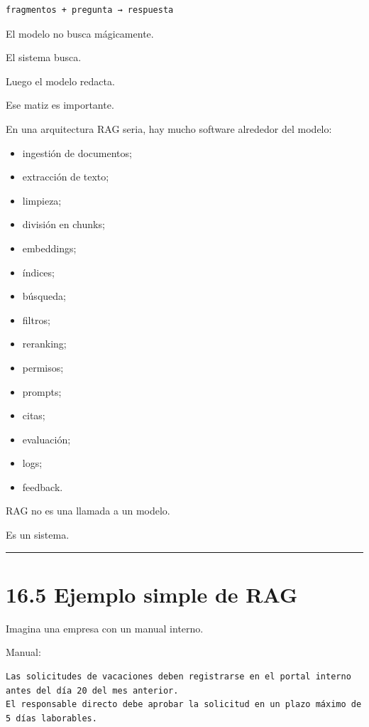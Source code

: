 \begin{lstlisting}
fragmentos + pregunta → respuesta
\end{lstlisting}

El modelo no busca mágicamente.

El sistema busca.

Luego el modelo redacta.

Ese matiz es importante.

En una arquitectura RAG seria, hay mucho software alrededor del modelo:

\begin{itemize}
\tightlist
\item
  ingestión de documentos;
\item
  extracción de texto;
\item
  limpieza;
\item
  división en chunks;
\item
  embeddings;
\item
  índices;
\item
  búsqueda;
\item
  filtros;
\item
  reranking;
\item
  permisos;
\item
  prompts;
\item
  citas;
\item
  evaluación;
\item
  logs;
\item
  feedback.
\end{itemize}

RAG no es una llamada a un modelo.

Es un sistema.

\begin{center}\rule{0.5\linewidth}{0.5pt}\end{center}

\section{16.5 Ejemplo simple de RAG}\label{ejemplo-simple-de-rag}

Imagina una empresa con un manual interno.

Manual:

\begin{lstlisting}
Las solicitudes de vacaciones deben registrarse en el portal interno antes del día 20 del mes anterior.
El responsable directo debe aprobar la solicitud en un plazo máximo de 5 días laborables.
\end{lstlisting}

